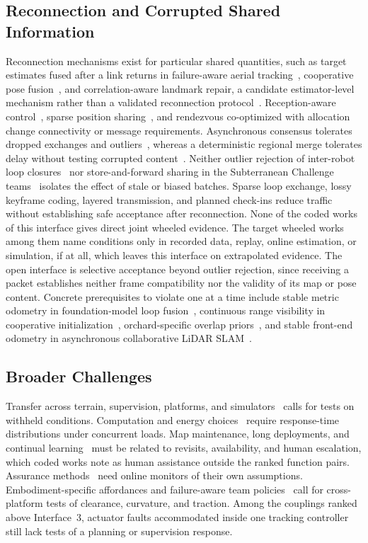 \subsection{Reconnection and Corrupted Shared Information}
Reconnection mechanisms exist for particular shared quantities, such as target estimates fused after a link returns in failure-aware aerial tracking~\cite{P_F12}, cooperative pose fusion~\cite{P_F15}, and correlation-aware landmark repair, a candidate estimator-level mechanism rather than a validated reconnection protocol~\cite{P_F03}. Reception-aware control~\cite{P_F13}, sparse position sharing~\cite{P_F14}, and rendezvous co-optimized with allocation~\cite{P_R19} change connectivity or message requirements. Asynchronous consensus tolerates dropped exchanges and outliers~\cite{P_R20,P_R23}, whereas a deterministic regional merge tolerates delay without testing corrupted content~\cite{P_R22}. Neither outlier rejection of inter-robot loop closures~\cite{P_K06,P_K07} nor store-and-forward sharing in the Subterranean Challenge teams~\cite{P_K08,P_K09,P_K10} isolates the effect of stale or biased batches. Sparse loop exchange, lossy keyframe coding, layered transmission, and planned check-ins reduce traffic~\cite{P_S10,P_S29,P_R21,P_S25} without establishing safe acceptance after reconnection. None of the \IfaceFourWorks{} coded works of this interface gives direct joint wheeled evidence. The \IfaceFourWhl{} target wheeled works among them name conditions only in recorded data, replay, online estimation, or simulation, if at all, which leaves this interface on extrapolated evidence. The open interface is selective acceptance beyond outlier rejection, since receiving a packet establishes neither frame compatibility nor the validity of its map or pose content. Concrete prerequisites to violate one at a time include stable metric odometry in foundation-model loop fusion~\cite{P_S11}, continuous range visibility in cooperative initialization~\cite{P_S27}, orchard-specific overlap priors~\cite{P_S23}, and stable front-end odometry in asynchronous collaborative LiDAR SLAM~\cite{P_R20}.

\subsection{Broader Challenges}
Transfer across terrain, supervision, platforms, and simulators~\cite{P_M42,P_E04,P_R15,P_R36} calls for tests on withheld conditions. Computation and energy choices~\cite{P_M11,P_E60,P_R31,P_R32} require response-time distributions under concurrent loads. Map maintenance, long deployments, and continual learning~\cite{P_E16,P_R07,P_R11,P_E15,P_M37,P_S14,P_S41,P_R29} must be related to revisits, availability, and human escalation, which \HumanAssistCount{} coded works note as human assistance outside the ranked function pairs. Assurance methods~\cite{P_X07,P_F08,P_E25,P_R14} need online monitors of their own assumptions. Embodiment-specific affordances and failure-aware team policies~\cite{P_R26,P_R35} call for cross-platform tests of clearance, curvature, and traction. Among the couplings ranked above Interface~3, actuator faults accommodated inside one tracking controller~\cite{P_M15,P_E52,P_F02} still lack tests of a planning or supervision response.

